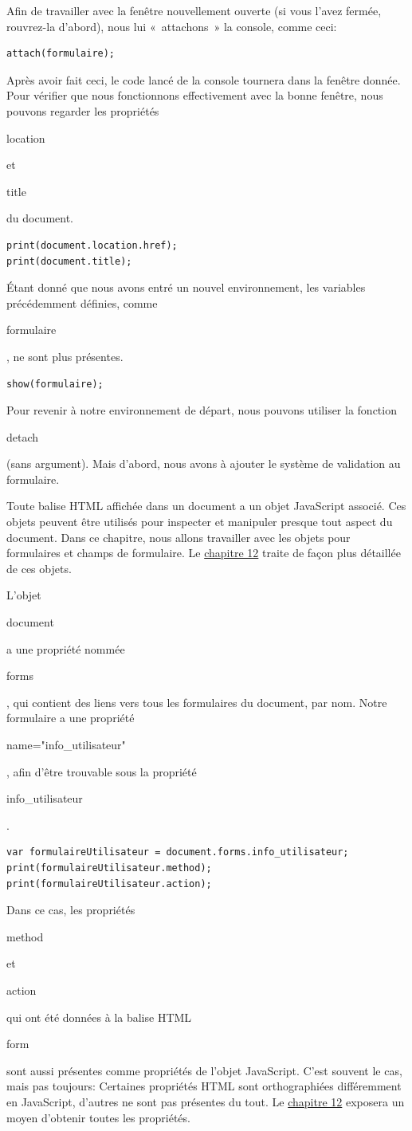 \documentclass{FramateX}
\renewcommand{\texttt}[1]{\begin{sffamily}{#1}\end{sffamily}}
\begin{document}
\begin{center}\end{center}

Afin de travailler avec la fenêtre nouvellement ouverte (si vous l'avez
fermée, rouvrez-la d'abord), nous lui «~attachons~» la console, comme
ceci:

\begin{lstlisting}
attach(formulaire);
\end{lstlisting}
Après avoir fait ceci, le code lancé de la console tournera dans la
fenêtre donnée. Pour vérifier que nous fonctionnons effectivement avec
la bonne fenêtre, nous pouvons regarder les propriétés \texttt{location}
et \texttt{title} du document.

\begin{lstlisting}
print(document.location.href);
print(document.title);
\end{lstlisting}
Étant donné que nous avons entré un nouvel environnement, les variables
précédemment définies, comme \texttt{formulaire}, ne sont plus
présentes.

\begin{lstlisting}
show(formulaire);
\end{lstlisting}
Pour revenir à notre environnement de départ, nous pouvons utiliser la
fonction \texttt{detach} (sans argument). Mais d'abord, nous avons à
ajouter le système de validation au formulaire.

\begin{center}\end{center}

Toute balise HTML affichée dans un document a un objet JavaScript
associé. Ces objets peuvent être utilisés pour inspecter et manipuler
presque tout aspect du document. Dans ce chapitre, nous allons
travailler avec les objets pour formulaires et champs de formulaire. Le
\href{chapter12.html}{chapitre 12} traite de façon plus détaillée de ces
objets.

L'objet \texttt{document} a une propriété nommée \texttt{forms}, qui
contient des liens vers tous les formulaires du document, par nom. Notre
formulaire a une propriété \texttt{name="info\_utilisateur"}, afin
d'être trouvable sous la propriété \texttt{info\_utilisateur}.

\begin{lstlisting}
var formulaireUtilisateur = document.forms.info_utilisateur;
print(formulaireUtilisateur.method);
print(formulaireUtilisateur.action);
\end{lstlisting}
Dans ce cas, les propriétés \texttt{method} et \texttt{action} qui ont
été données à la balise HTML \texttt{form} sont aussi présentes comme
propriétés de l'objet JavaScript. C'est souvent le cas, mais pas
toujours: Certaines propriétés HTML sont orthographiées différemment en
JavaScript, d'autres ne sont pas présentes du tout. Le
\href{chapter12.html}{chapitre 12} exposera un moyen d'obtenir toutes
les propriétés.
\end{document}
